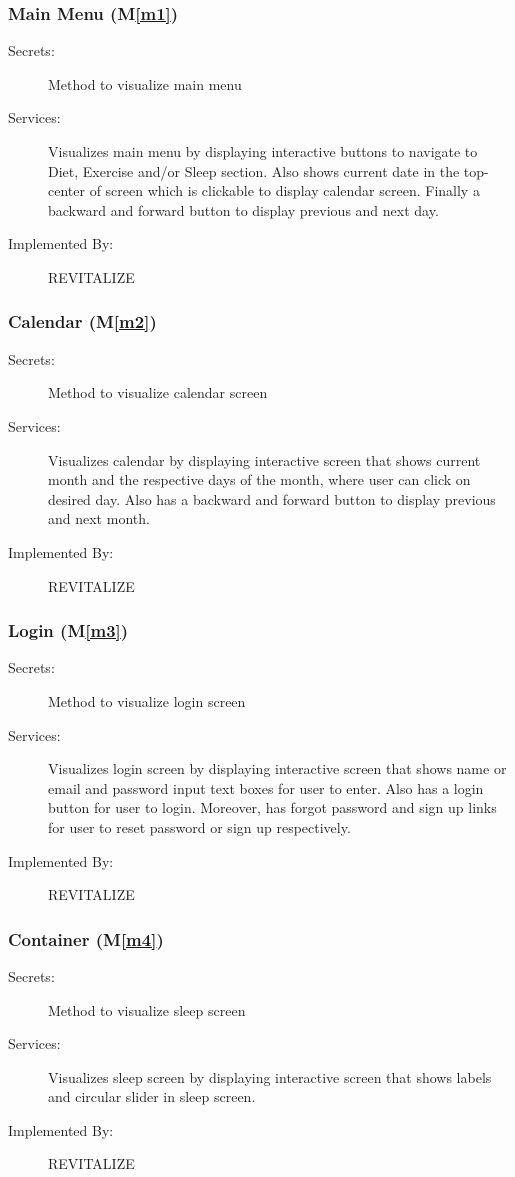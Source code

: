 \documentclass[12pt, titlepage]{article}
\newcommand{\mref}[1]{M\ref{#1}}
\begin{document}
\subsubsection{Main Menu (\mref{m1})}
\begin{description}
	\item[Secrets:]Method to visualize main menu
	\item[Services:]Visualizes main menu by displaying interactive buttons to navigate to Diet, Exercise and/or Sleep section. Also shows current date in the top-center of screen which is clickable to display calendar screen. Finally a backward and forward button to display previous and next day.
	\item[Implemented By:] REVITALIZE
\end{description}

\subsubsection{Calendar (\mref{m2})}
\begin{description}
	\item[Secrets:]Method to visualize calendar screen
	\item[Services:]Visualizes calendar by displaying interactive screen that shows current month and the respective days of the month, where user can click on desired day. Also has a backward and forward button to display previous and next month.
	\item[Implemented By:] REVITALIZE
\end{description}

\subsubsection{Login (\mref{m3})}
\begin{description}
	\item[Secrets:]Method to visualize login screen
	\item[Services:]Visualizes login screen by displaying interactive screen that shows name or email and password input text boxes for user to enter. Also has a login button for user to login. Moreover, has forgot password and sign up links for user to reset password or sign up respectively.
	\item[Implemented By:] REVITALIZE
\end{description}

\subsubsection{Container (\mref{m4})}
\begin{description}
	\item[Secrets:]Method to visualize sleep screen
	\item[Services:]Visualizes sleep screen by displaying interactive screen that shows labels and circular slider in sleep screen.
	\item[Implemented By:] REVITALIZE
\end{description}
\end{document}
